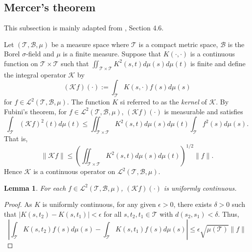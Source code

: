 \documentclass[11pt]{article}
\theoremstyle{plain}
\newtheorem{lemma}{\quad\quad Lemma}
\theoremstyle{definition}
\theoremstyle{remark}
\begin{document}
\subsection{Mercer's theorem}
This subsection is mainly adapted from \cite{book:1323324}, Section 4.6.

Let $(\mathcal T, \mathcal B, \mu)$ be a measure space where $\mathcal T$ is a compact metric space, $\mathcal B$ is the Borel $\sigma$-field and $\mu$ is a finite measure.
Suppose that $K(\cdot,\cdot)$ is a continuous function on $\mathcal T \times \mathcal T$ such that $\iint_{\mathcal T \times \mathcal T} K^2(s,t) d\mu (s) d\mu(t)$ is finite and define the integral operator $\mathcal K$ by
\begin{equation*}
    (\mathcal K f ) (\cdot) := \int_{\mathcal T} K(s, \cdot) f(s) d\mu(s)
\end{equation*}
for $f\in \mathcal L^2(\mathcal T, \mathcal B, \mu)$.
The function $K$ si referred to as the \emph{kernel} of $\mathcal K$.
By Fubini's theorem, for $f\in \mathcal L^2(\mathcal T, \mathcal B, \mu)$, $(\mathcal K f)(\cdot)$ is measurable and satisfies
\begin{equation*}
    \int_{\mathcal T} (\mathcal K f)^2 (t) d\mu(t)
    \leq
    \iint_{\mathcal T \times \mathcal T} K^2(s,t) d\mu(s) d\mu(t)
    \int_{\mathcal T} f^2(s) d\mu(s).
\end{equation*}
That is, 
\begin{equation*}
\|\mathcal K f\|\leq 
\left( 
\iint_{\mathcal T \times \mathcal T} K^2(s,t) d\mu(s) d\mu(t)
\right)^{1/2}
\|f\|.
\end{equation*}
Hence $\mathcal K$ is a continuous operator on $\mathcal L^2(\mathcal T, \mathcal B, \mu)$.
\begin{lemma}\label{M:lemma}
    For each $f\in \mathcal L^2(\mathcal T, \mathcal B, \mu)$, $(\mathcal K f)(\cdot)$ is uniformly continuous.
\end{lemma}
\begin{proof}
    As $K$ is uniformly continuous, for any given $\epsilon >0$, there exists $\delta >0$ such that $|K(s,t_2)- K(s,t_1)|< \epsilon$ for all $s,t_2,t_1\in \mathcal T$ with $d(s_2,s_1)< \delta$.
    Thus,
    \begin{equation*}
        |
        \int_{\mathcal T} K(s,t_2)  f(s) d\mu(s)-\int_{\mathcal T} K(s,t_1) f(s) d\mu(s)
        |
        \leq \epsilon \sqrt{\mu (\mathcal T)} \|f\|
    \end{equation*}
\end{proof}
\end{document}
